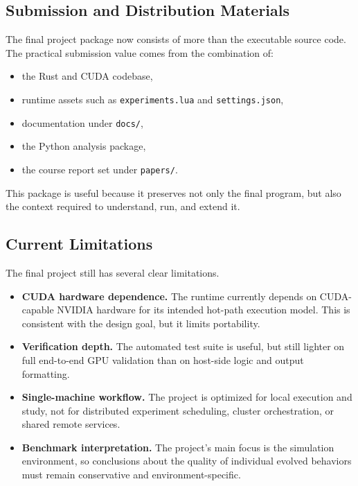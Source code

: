 \subsection{Submission and Distribution Materials}

The final project package now consists of more than the executable source code. The practical
submission value comes from the combination of:

\begin{itemize}[nosep]
  \item the Rust and CUDA codebase,
  \item runtime assets such as \texttt{experiments.lua} and \texttt{settings.json},
  \item documentation under \texttt{docs/},
  \item the Python analysis package,
  \item the course report set under \texttt{papers/}.
\end{itemize}

This package is useful because it preserves not only the final program, but also the context
required to understand, run, and extend it.

\subsection{Current Limitations}

The final project still has several clear limitations.

\begin{itemize}[leftmargin=*]
  \item \textbf{CUDA hardware dependence.} The runtime currently depends on CUDA-capable NVIDIA
  hardware for its intended hot-path execution model. This is consistent with the design goal,
  but it limits portability.

  \item \textbf{Verification depth.} The automated test suite is useful, but still lighter on full
  end-to-end GPU validation than on host-side logic and output formatting.

  \item \textbf{Single-machine workflow.} The project is optimized for local execution and study,
  not for distributed experiment scheduling, cluster orchestration, or shared remote services.

  \item \textbf{Benchmark interpretation.} The project's main focus is the simulation
  environment, so conclusions about the quality of individual evolved behaviors must remain
  conservative and environment-specific.
\end{itemize}

